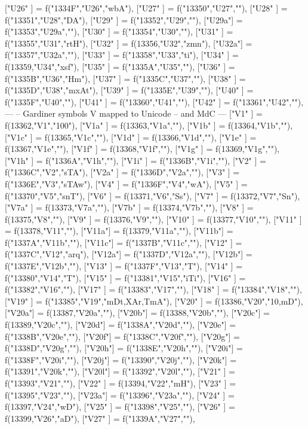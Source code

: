 {["U26" ] = f("1334F","U26","wbA"),
["U27" ] = f("13350","U27",""),
["U28" ] = f("13351","U28","DA"),
["U29" ] = f("13352","U29",""),
["U29a"] = f("13353","U29a",""),
["U30" ] = f("13354","U30",""),
["U31" ] = f("13355","U31","rtH"),
["U32" ] = f(13356,"U32","zmn"),
["U32a"] = f("13357","U32a",""),
["U33" ] = f("13358","U33","ti"),
["U34" ] = f(13359,"U34","xsf"),
["U35" ] = f("1335A","U35",""),
["U36" ] = f("1335B","U36","Hm"),
["U37" ] = f("1335C","U37",""),
["U38" ] = f("1335D","U38","mxAt"),
["U39" ] = f("1335E","U39",""),
["U40" ] = f("1335F","U40",""),
["U41" ] = f("13360","U41",""),
["U42" ]  = f("13361","U42",""),
---
-- Gardiner symbols V mapped to Unicode
-- and MdC
---
["V1"  ]  = f(13362,"V1","100"),
["V1a" ]  = f(13363,"V1a",""),
    ["V1b" ]  = f(13364,"V1b",""),
    ["V1c" ] = f(13365,"V1c",""),
   ["V1d" ] = f(13366,"V1d",""),
   ["V1e" ]  = f(13367,"V1e",""),
   ["V1f" ]  = f(13368,"V1f",""),
   ["V1g" ]  = f(13369,"V1g",""),
   ["V1h" ]  = f("1336A","V1h",""),
   ["V1i" ]  = f("1336B","V1i",""),
["V2"  ]  = f("1336C","V2","sTA"),
["V2a" ]  = f("1336D","V2a",""),
["V3"  ]  = f("1336E","V3","sTAw"),
["V4"  ]  = f("1336F","V4","wA"),
["V5"  ]  = f("13370","V5","snT"),
["V6"  ]  = f(13371,"V6","Ss"),
["V7"  ]  = f(13372,"V7","Sn"),
["V7a" ]  = f(13373,"V7a",""),
["V7b" ]  = f(13374,"V7b",""),
["V8"  ]  = f(13375,"V8",""),
["V9"  ]  = f(13376,"V9",""),
["V10" ]  = f(13377,"V10",""),
["V11" ]  = f(13378,"V11",""),
["V11a"]  = f(13379,"V11a",""),
["V11b"]  = f("1337A","V11b",""),
["V11c"]  = f("1337B","V11c",""),
["V12" ]  = f("1337C","V12","arq"),
["V12a"]  = f("1337D","V12a",""),
["V12b"]  = f("1337E","V12b",""),
["V13" ]  = f("1337F","V13","T"),
["V14" ]  = f("13380","V14","T"),
["V15" ]  = f("13381","V15","iTi"),
["V16" ]  = f("13382","V16",""),
["V17" ]  = f("13383","V17",""),
["V18" ]  = f("13384","V18",""),
["V19" ]  = f("13385","V19","mDt,XAr,TmA"),
["V20" ]  = f(13386,"V20","10,mD"),
["V20a"]  = f(13387,"V20a",""),
["V20b"] = f(13388,"V20b",""),
["V20c"]  = f(13389,"V20c",""),
["V20d"]  = f("1338A","V20d",""),
["V20e"]  = f("1338B","V20e",""),
["V20f"]  = f("1338C","V20f",""),
["V20g"]  = f("1338D","V20g",""),
["V20h"]  = f("1338E","V20h",""),
["V20i"]  = f("1338F","V20i",""),
["V20j"]  = f("13390","V20j",""),
["V20k"]  = f("13391","V20k",""),
["V20l"]  = f("13392","V20l",""),
["V21" ]  = f("13393","V21",""),
["V22" ]    = f(13394,"V22","mH"),
["V23" ]    = f("13395","V23",""),
["V23a"]    = f("13396","V23a",""),
["V24" ]    = f(13397,"V24","wD"),
["V25" ]    = f("13398","V25",""),
["V26" ]    = f(13399,"V26","aD"),
["V27" ]    = f("1339A","V27",""),
}
